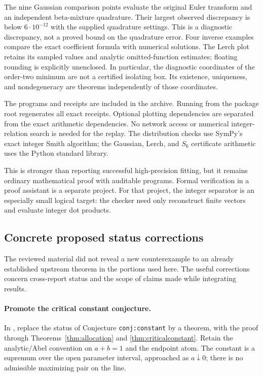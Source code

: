 The nine Gaussian comparison points evaluate the original Euler
transform and an independent beta-mixture quadrature. Their largest
observed discrepancy is below $6\cdot10^{-12}$ with the supplied
quadrature settings. This is a diagnostic discrepancy, not a proved
bound on the quadrature error. Four inverse examples compare the exact
coefficient formula with numerical solutions. The Lerch plot retains
its sampled values and analytic omitted-function estimates; floating
rounding is explicitly unenclosed. In particular, the diagnostic
coordinates of the order-two minimum are not a certified isolating box.
Its existence, uniqueness, and nondegeneracy are theorems independently
of those coordinates.

The programs and receipts are included in the archive. Running
 from the package root regenerates all exact
receipts. Optional plotting dependencies are separated from the exact
arithmetic dependencies. No network access or numerical
integer-relation search is needed for the replay. The distribution
checks use SymPy's exact integer Smith algorithm; the Gaussian, Lerch,
and $S_6$ certificate arithmetic uses the Python standard library.

This is stronger than reporting successful high-precision fitting,
but it remains ordinary mathematical proof with auditable programs.
Formal verification in a proof assistant is a separate project. For
that project, the integer separator is an especially small logical
target: the checker need only reconstruct finite vectors and evaluate
integer dot products.

\subsection{Concrete proposed status corrections}

The reviewed material did not reveal a new counterexample to an
already established upstream theorem in the portions used here.
The useful corrections concern cross-report status and the scope of
claims made while integrating results.

\paragraph{Promote the critical constant conjecture.}
In \cite{realorder}, replace the status of Conjecture
\texttt{conj:constant} by a theorem, with the proof through
Theorems~\ref{thm:allocation} and \ref{thm:criticalconstant}.
Retain the analytic/Abel convention on $a+b=1$ and the endpoint atom.
The constant is a supremum over the open parameter interval, approached
as $a\downarrow0$; there is no admissible maximizing pair on the line.

